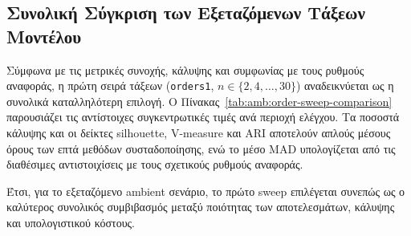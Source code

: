 \subsection{Συνολική Σύγκριση των Εξεταζόμενων Τάξεων Μοντέλου}
\label{amb:order_comparison}
Σύμφωνα με τις μετρικές συνοχής, κάλυψης και συμφωνίας με τους ρυθμούς
αναφοράς, η πρώτη σειρά τάξεων (\texttt{orders1},
$n\in\{2,4,\ldots,30\}$) αναδεικνύεται ως η συνολικά καταλληλότερη
επιλογή. Ο Πίνακας~\ref{tab:amb:order-sweep-comparison} παρουσιάζει τις
αντίστοιχες συγκεντρωτικές τιμές ανά περιοχή ελέγχου. Τα ποσοστά κάλυψης
και οι δείκτες silhouette, V-measure και ARI αποτελούν απλούς μέσους όρους
των επτά μεθόδων συσταδοποίησης, ενώ το μέσο MAD υπολογίζεται από τις
διαθέσιμες αντιστοιχίσεις με τους σχετικούς ρυθμούς αναφοράς.

\begin{table}[htbp]
    \centering
    \caption{Συγκεντρωτική σύγκριση των δύο σαρώσεων τάξεων μοντέλου ανά περιοχή ελέγχου.}
    \label{tab:amb:order-sweep-comparison}
\end{table}

Έτσι, για το εξεταζόμενο ambient σενάριο, το πρώτο sweep επιλέγεται συνεπώς ως ο καλύτερος συνολικός
συμβιβασμός μεταξύ ποιότητας των αποτελεσμάτων, κάλυψης και υπολογιστικού
κόστους.



